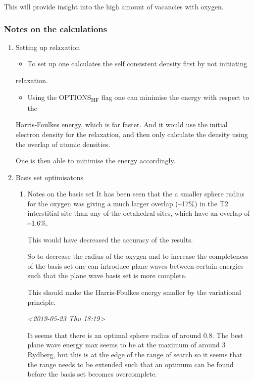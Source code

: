 \documentclass[11pt]{article}
\begin{document}
This will provide insight into the high amount of vacancies with oxygen. 
\subsubsection{Notes on the calculations}
\label{sec:orgbff9149}
\begin{enumerate}
\item Setting up relaxation
\label{sec:org3051925}
\begin{itemize}
\item To set up one calculates the self consistent density first by not initiating
\end{itemize}
relaxation. 

\begin{itemize}
\item Using the OPTIONS\textsubscript{HF} flag one can minimise the energy with respect to the
\end{itemize}
Harris-Foulkes energy, which is far faster. And it would use the initial
electron density for the relaxation, and then only calculate the density using
the overlap of atomic densities. 

One is then able to minimise the energy accordingly. 

\item Basis set optimisatons
\label{sec:orga65a295}

\begin{enumerate}
\item Notes on the basis set
\label{sec:org9792ae2}
It has been seen that the a smaller sphere radius for the oxygen was giving a much
larger overlap (\textasciitilde{}17\%) in the T2 interstitial site than any of the octahedral
sites, which have an overlap of \textasciitilde{}1.6\%. 

This would have decreased the accuracy of the results. 

So to decrease the radius of the oxygen and to increase the completeness of
the basis set one can introduce plane waves between certain energies such that
the plane wave basis set is more complete.

This should make the Harris-Foulkes energy smaller by the variational
principle. 

\textit{<2019-05-23 Thu 18:19>}

It seems that there is an optimal sphere radius of around 0.8. 
The best plane wave energy max seems to be at the maximum of around 3 Rydberg,
but this is at the edge of the range of search so it seems that the range
needs to be extended such that an optimum can be found before the basis set
becomes overcomplete. 


\end{enumerate}
\end{enumerate}
\end{document}
